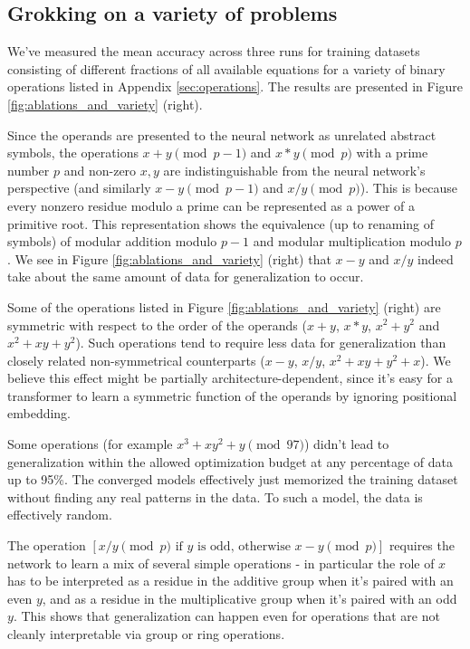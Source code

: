 \documentclass{article} %
\begin{document}
\subsection{Grokking on a variety of problems}

We've measured the mean accuracy across three runs for training datasets consisting of different fractions of all available equations for a variety of binary operations listed in Appendix \ref{sec:operations}. The results are presented in Figure \ref{fig:ablations_and_variety} (right).

Since the operands are presented to the neural network as unrelated abstract symbols, the operations $x+y \pmod {p-1}$ and $x*y \pmod {p}$ with a prime number $p$ and non-zero $x,y$ are indistinguishable from the neural network's perspective (and similarly $x-y \pmod {p-1}$ and $x/y \pmod {p}$). This is because every nonzero residue modulo a prime can be represented as a power of a primitive root. This representation shows the equivalence (up to renaming of symbols) of modular addition modulo $p-1$ and modular multiplication modulo $p$. We see in Figure \ref{fig:ablations_and_variety} (right) that $x-y$ and $x/y$ indeed take about the same amount of data for generalization to occur.

Some of the operations listed in Figure \ref{fig:ablations_and_variety} (right) are symmetric with respect to the order of the operands ($x+y$, $x*y$, $x^2+y^2$ and $x^2+xy+y^2$). Such operations tend to require less data for generalization than closely related non-symmetrical counterparts ($x-y$, $x/y$, $x^2+xy+y^2+x$). We believe this effect might be partially architecture-dependent, since it's easy for a transformer to learn a symmetric function of the operands by ignoring positional embedding.

Some operations (for example  $x^3+xy^2+y \pmod {97}$) didn't lead to generalization within the allowed optimization budget at any percentage of data up to 95\%. The converged models effectively just memorized the training dataset without finding any real patterns in the data. To such a model, the data is effectively random.

The operation $[x / y \pmod {p} \text{ if } y \text{ is odd, otherwise } x - y \pmod {p}]$ requires the network to learn a mix of several simple operations - in particular the role of $x$ has to be interpreted as a residue in the additive group when it's paired with an even $y$, and as a residue in the multiplicative group when it's paired with an odd $y$. This shows that generalization can happen even for operations that are not cleanly interpretable via  group or ring operations.
\end{document}
